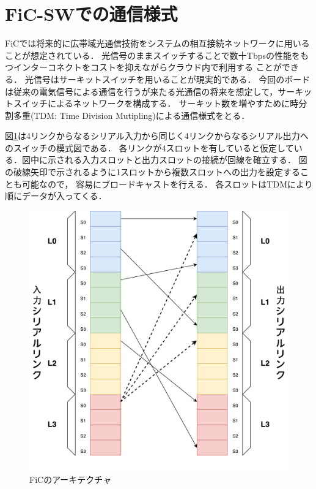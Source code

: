 {  \section{FiC-SWでの通信様式}
  \label{sec:ficsw_communication}
  FiCでは将来的に広帯域光通信技術をシステムの相互接続ネットワークに用いることが想定されている．
  光信号のままスイッチすることで数十Tbpsの性能をもつインターコネクトをコストを抑えながらクラウド内で利用する
  ことができる．
  光信号はサーキットスイッチを用いることが現実的である．
  今回のボードは従来の電気信号による通信を行うが来たる光通信の将来を想定して，サーキットスイッチによるネットワークを構成する．
  サーキット数を増やすために時分割多重(TDM: Time Division Mutipling)による通信様式をとる．
  
  図\ref{fig:arch-sw}は4リンクからなるシリアル入力から同じく4リンクからなるシリアル出力へのスイッチの模式図である．
  各リンクが4スロットを有していると仮定している．図中に示される入力スロットと出力スロットの接続が回線を確立する．
  図の破線矢印で示されるように1スロットから複数スロットへの出力を設定することも可能なので，
  容易にブロードキャストを行える．
  各スロットはTDMにより順にデータが入ってくる．
  
   \begin{figure}[h]
     \centering
     \includegraphics[width=12cm]{./chap3/fig/arch_sw.pdf}
     \caption{FiCのアーキテクチャ}
     \label{fig:arch-sw}
   \end{figure}
}
